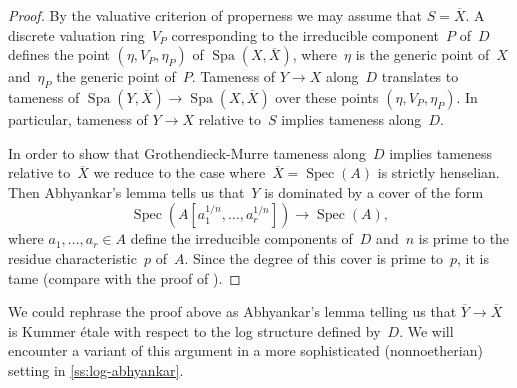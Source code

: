 \documentclass[a4paper,twoside,11pt,reqno]{amsart}
\DeclareMathOperator{\Spec}{Spec}
\DeclareMathOperator{\Spa}{Spa}
\newcommand{\ov}[1]{\overline{#1}}
\theoremstyle{definition}
\numberwithin{equation}{subsection}
\begin{document}
\begin{proof}
    By the valuative criterion of properness we may assume that $S = \ov X$.
    A discrete valuation ring~$V_P$ corresponding to the irreducible component~$P$ of~$D$ defines the point $(\eta,V_P,\eta_P)$ of $\Spa(X,\ov X)$, where~$\eta$ is the generic point of~$X$ and~$\eta_P$ the generic point of~$P$.
    Tameness of $Y \to X$ along~$D$ translates to tameness of $\Spa(Y,\ov X) \to \Spa(X,\ov X)$ over these points $(\eta,V_P,\eta_P)$.
    In particular, tameness of $Y \to X$ relative to~$S$ implies tameness along~$D$.

    In order to show that Grothendieck-Murre tameness along~$D$ implies tameness relative to~$\ov X$ we reduce to the case where~$\ov X = \Spec(A)$ is strictly henselian.
    Then Abhyankar's lemma \cite[XIII Proposition~5.2]{SGA1} tells us that~$Y$ is dominated by a cover of the form
    \[
     \Spec(A[a_1^{1/n},\ldots,a_r^{1/n}]) \longrightarrow \Spec(A),
    \]
    where $a_1,\ldots,a_r \in A$ define the irreducible components of~$D$ and~$n$ is prime to the residue characteristic~$p$ of~$A$.
    Since the degree of this cover is prime to~$p$, it is tame (compare with the proof of \cite[Proposition~4.2]{KerzSchmidt2010:DifferentNotionsTameness}).
\end{proof}

We could rephrase the proof above as Abhyankar's lemma telling us that $\ov Y \to \ov X$ is Kummer étale with respect to the log structure defined by~$D$.
We will encounter a variant of this argument in a more sophisticated (nonnoetherian) setting in \cref{ss:log-abhyankar}.
\end{document}
